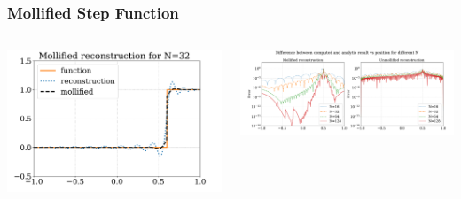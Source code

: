 \documentclass[9pt,usepdftitle=false,aspectratio=169]{beamer}
\begin{document}
\begin{frame}
  \frametitle{Mollified Step Function}
  \begin{columns}
    \begin{column}{0.4\textwidth}
      \centering
      \includegraphics[width=\textwidth]{mollifiedN32_edge}
    \end{column}
    \begin{column}{0.7\textwidth}
      \centering
      \includegraphics[width=\textwidth]{mollified_unmollified}
    \end{column}
  \end{columns}
\end{frame}
\end{document}
